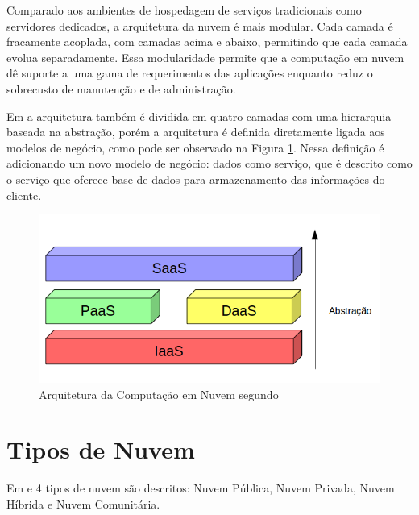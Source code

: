 Comparado aos ambientes de hospedagem de serviços tradicionais como servidores dedicados, a arquitetura da nuvem é mais modular. Cada camada é fracamente acoplada, com camadas acima e abaixo, permitindo que cada camada evolua separadamente. Essa modularidade permite que a computação em nuvem dê suporte a uma gama de requerimentos das aplicações enquanto reduz o sobrecusto de manutenção e de administração.

Em \citep{demystifingCloud:2011} a arquitetura também é dividida em quatro camadas com uma hierarquia baseada na abstração, porém a arquitetura é definida diretamente ligada aos modelos de negócio, como pode ser observado na Figura \ref{architecture2}. Nessa definição é adicionando um novo modelo de negócio: dados como serviço, que é descrito como o serviço que oferece base de dados para armazenamento das informações do cliente. 

\begin{figure}[htbp]
  \centering \includegraphics[scale=.6]{imgs/architecture2.png}
\caption{Arquitetura da Computação em Nuvem segundo \citep{demystifingCloud:2011}} 
\label{architecture2}
\end{figure}

\section{Tipos de Nuvem} \label{cloud:types}

	Em \citep{stateOfArt:2010} e \cite{NIST:2011} 4 tipos de nuvem são descritos: Nuvem Pública, Nuvem Privada, Nuvem Híbrida e Nuvem Comunitária.

